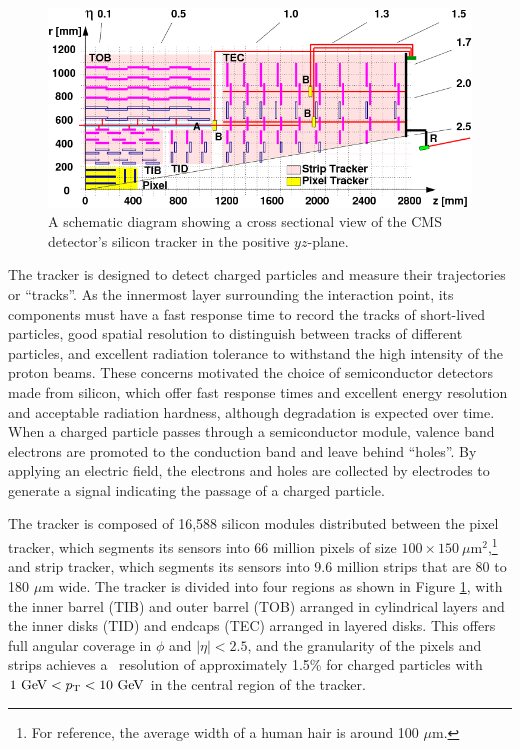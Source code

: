 \begin{figure}[htbp]
  \centering
    \includegraphics[width=5.5in]{images/tracker_diagram}
    \caption[Schematic for the CMS Silicon Tracker]{A schematic diagram showing a cross sectional view of the CMS detector's silicon tracker in the positive $yz$-plane.\cite{TRACKERDIAGRAM}}
    \label{fig:CMStrackerdiag}
\end{figure}

The tracker is designed to detect charged particles and measure their trajectories or ``tracks''. As the innermost layer surrounding the interaction point, its components must have a fast response time to record the tracks of short-lived particles, good spatial resolution to distinguish between tracks of different particles, and excellent radiation tolerance to withstand the high intensity of the proton beams. These concerns motivated the choice of semiconductor detectors made from silicon, which offer fast response times and excellent energy resolution and acceptable radiation hardness, although degradation is expected over time. When a charged particle passes through a semiconductor module, valence band electrons are promoted to the conduction band and leave behind ``holes''. By applying an electric field, the electrons and holes are collected by electrodes to generate a signal indicating the passage of a charged particle. 

The tracker is composed of 16,588 silicon modules distributed between the pixel tracker, which segments its sensors into 66 million pixels of size $100 \times 150\ \mu\mathrm{m}^{2}$,\footnote{For reference, the average width of a human hair is around 100 $\mu\mathrm{m}$.} and strip tracker, which segments its sensors into 9.6 million strips that are 80 to 180 $\mu\mathrm{m}$ wide. The tracker is divided into four regions as shown in Figure \ref{fig:CMStrackerdiag}, with the inner barrel (TIB) and outer barrel (TOB) arranged in cylindrical layers and the inner disks (TID) and endcaps (TEC) arranged in layered disks. This offers full angular coverage in $\phi$ and $\left| \eta \right| < 2.5$, and the granularity of the pixels and strips achieves a \pT\ resolution of approximately 1.5\% for charged particles with $1\ \mathrm{GeV} < p_{\mathrm{T}} < 10\ \mathrm{GeV}$ in the central region of the tracker.\cite{CMSTRACKERPERF}

